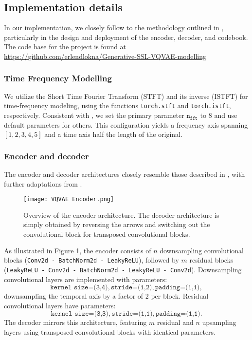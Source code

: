 \documentclass[../../thesis.tex]{subfiles}
\begin{document}
\subsection{Implementation details}

In our implementation, we closely follow to the methodology outlined in \cite{TimeVQVAE}, particularly in the design and deployment of the encoder, decoder, and codebook. The code base for the project is found at \url{https://github.com/erlendlokna/Generative-SSL-VQVAE-modelling}

\subsubsection{Time Frequency Modelling}
We utilize the Short Time Fourier Transform (STFT) and its inverse (ISTFT) for time-frequency modeling, using the functions \texttt{torch.stft} and \texttt{torch.istft}, respectively. Consistent with \cite{TimeVQVAE}, we set the primary parameter $\texttt{n}_{\texttt{fft}}$ to 8 and use default parameters for others. This configuration yields a frequency axis spanning $[1, 2, 3, 4, 5]$ and a time axis half the length of the original.

\subsubsection{Encoder and decoder}

The encoder and decoder architectures closely resemble those described in \cite{nadavbh12}, with further adaptations from \cite{TimeVQVAE}.\newline

\begin{figure}[h]
    \texttt{[image: VQVAE Encoder.png]}
    \centering
    \caption{Overview of the encoder architecture. The decoder architecture is simply obtained by reversing the arrows and switching out the convolutional block for transposed convolutional blocks.}
    \label{fig:VQVAE Encoder}
\end{figure}
As illustrated in Figure \ref{fig:VQVAE Encoder}, the encoder consists of $n$ downsampling convolutional blocks (\texttt{Conv2d - BatchNorm2d - LeakyReLU}), followed by $m$ residual blocks (\texttt{LeakyReLU - Conv2d - BatchNorm2d - LeakyReLU - Conv2d}). Downsampling convolutional layers are implemented with parameters: 
\[\texttt{kernel size=(3,4)}, \texttt{stride=(1,2)}, \texttt{padding=(1,1)},\] downsampling the temporal axis by a factor of 2 per block. Residual convolutional layers have parameters: 
\[\texttt{kernel size=(3,3)},\texttt{stride=(1,1)}, \texttt{padding=(1,1)}.\]
The decoder mirrors this architecture, featuring $m$ residual and $n$ upsampling layers using transposed convolutional blocks with identical parameters.\newline
\end{document}
